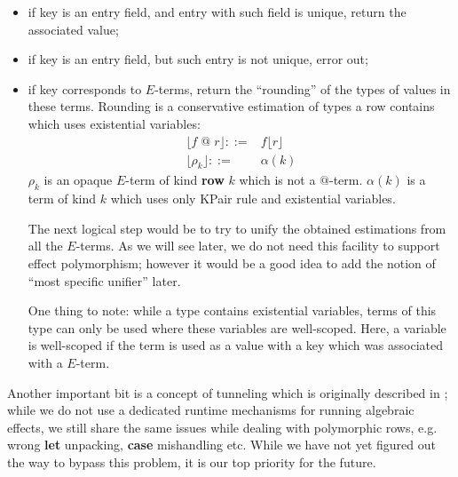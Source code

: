 \documentclass[a4paper,14pt]{extreport}
\begin{document}
\begin{itemize}
    \item if key is an entry field, and entry with such field is unique, return
        the associated value;
    \item if key is an entry field, but such entry is not unique, error out;
    \item if key corresponds to $E$-terms, return the ``rounding'' of the types
        of values in these terms. Rounding is a conservative estimation of types
        a row contains which uses existential variables:
        \[
            \begin{array}{rl}
                \lfloor f \;@\; r \rfloor ::=& f \lfloor r \rfloor \\
                \lfloor \rho_k \rfloor ::=& \alpha(k)
            \end{array}
        \]
        $\rho_k$ is an opaque $E$-term of kind \textbf{row} $k$ which is not a
        $@$-term. $\alpha(k)$ is a term of kind $k$ which uses only KPair rule
        and existential variables.

        The next logical step would be to try to unify the obtained estimations
        from all the $E$-terms. As we will see later, we do not need this
        facility to support effect polymorphism; however it would be a good
        idea to add the notion of ``most specific unifier'' later.

        One thing to note: while a type contains existential variables, terms of
        this type can only be used where these variables are well-scoped. Here,
        a variable is well-scoped if the term is used as a value with a key
        which was associated with a $E$-term.
\end{itemize}

Another important bit is a concept of tunneling which is originally described in
\cite{tunnel}; while we do not use a dedicated runtime mechanisms for running
algebraic effects, we still share the same issues while dealing with polymorphic
rows, e.g. wrong \textbf{let} unpacking, \textbf{case} mishandling etc. While we
have not yet figured out the way to bypass this problem, it is our top priority
for the future.
\end{document}
